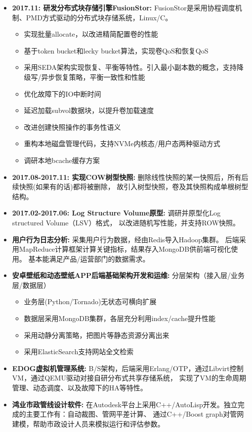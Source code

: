   \begin{itemize}[leftmargin=*]
      \item \textbf{2017.11: 研发分布式块存储引擎FusionStor:} FusionStor是采用协程调度机制、PMD方式驱动的分布式块存储系统，Linux/C。
          {\small
          \begin{itemize}
              \item 实现批量allocate，以改进精简配置卷的性能
              \item 基于token bucket和lecky bucket算法，实现卷QoS和恢复QoS
              \item 采用SEDA架构实现恢复、平衡等特性。引入最小副本数的概念，支持降级写/异步恢复策略，平衡一致性和性能
              \item 优化故障下的IO中断时间
              \item 延迟加载subvol数据块，以提升卷加载速度
              \item 改进创建快照操作的事务性语义
              \item 重构本地磁盘管理代码，支持NVMe内核态/用户态两种驱动方式
              \item 调研本地bcache缓存方案
          \end{itemize}
          }

      \item \textbf{2017.08-2017.11: 实现COW树型快照:} 删除线性快照的某一快照后，所有后续快照(如果有的话)都将被删除，
          故引入树型快照，卷及其快照构成单根树型结构。

      \item \textbf{2017.02-2017.06: Log Structure Volume原型:} 调研并原型化Log structured Volume（LSV）格式，
          以改进随机写性能，并支持ROW快照。

      \item \textbf{用户行为日志分析:} 采集用户行为数据，经由Redis导入Hadoop集群。
          后端采用MapReduce计算框架计算关键指标，结果存入MongoDB供前端可视化使用。
          基本能满足产品/运营部门的数据需求。

      \item \textbf{安卓壁纸和动态壁纸APP后端基础架构开发和运维:} 分层架构（接入层/业务层/数据层）
          {\small
          \begin{itemize}
              \item 业务层(Python/Tornado)无状态可横向扩展
              \item 数据层采用MongoDB集群，各层充分利用index/cache提升性能
              \item 采用动静分离策略，把图片等静态资源分离出来
              \item 采用ElasticSearch支持网站全文检索
          \end{itemize}
          }

      \item \textbf{EDOG虚拟机管理系统:} B/S架构，后端采用Erlang/OTP，通过Libvirt控制VM，通过QEMU驱动对接自研分布式共享存储系统，
          实现了VM的生命周期管理、动态调度、以及故障下的HA等特性。

      \item \textbf{鸿业市政管线设计软件:} 在Autodesk平台上采用C++/AutoLisp开发。独立完成的主要工作有：自动裁图、管网平差计算、
          通过C++/Boost graph对管网建模，帮助市政设计人员来模拟运行和评估参数。

  \end{itemize}
